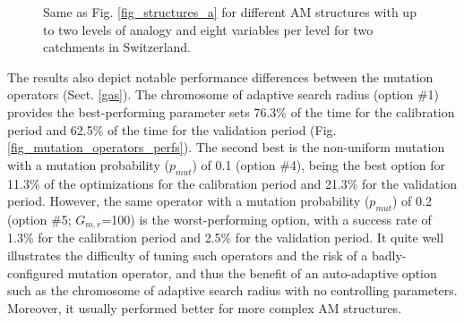 \documentclass[draft]{agujournal2019}
\begin{document}
\begin{figure}[hbt]
	\noindent{}
	\caption{Same as Fig. \ref{fig_structures_a} for different AM structures with up to two levels of analogy and eight variables per level for two catchments in Switzerland.}
	\label{fig_structures_b}
\end{figure}

The results also depict notable performance differences between the mutation operators (Sect. \ref{gas}). The chromosome of adaptive search radius (option \#1) provides the best-performing parameter sets 76.3\% of the time for the calibration period and 62.5\% of the time for the validation period (Fig. \ref{fig_mutation_operators_perfs}). The second best is the non-uniform mutation with a mutation probability ($p_{mut}$) of 0.1 (option \#4), being the best option for 11.3\% of the optimizations for the calibration period and 21.3\% for the validation period. However, the same operator with a  mutation probability ($p_{mut}$) of 0.2 (option \#5; $G_{m,r}$=100) is the worst-performing option, with a success rate of 1.3\% for the calibration period and 2.5\% for the validation period. It quite well illustrates the difficulty of tuning such operators and the risk of a badly-configured mutation operator, and thus the benefit of an auto-adaptive option such as the chromosome of adaptive search radius with no controlling parameters. Moreover, it usually performed better for more complex AM structures.
\end{document}
